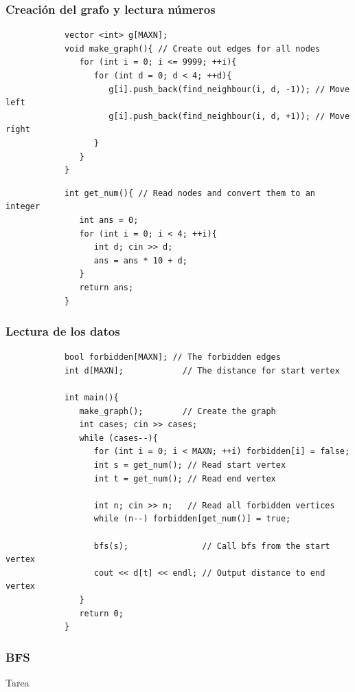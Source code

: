 \documentclass{beamer}
\begin{document}
	\begin{frame}[fragile]
		\frametitle{Creación del grafo y lectura números}
		\begin{lstlisting}
			vector <int> g[MAXN];
			void make_graph(){ // Create out edges for all nodes
			   for (int i = 0; i <= 9999; ++i){
			      for (int d = 0; d < 4; ++d){
			         g[i].push_back(find_neighbour(i, d, -1)); // Move left
			         g[i].push_back(find_neighbour(i, d, +1)); // Move right
			      }
			   }
			}
		\end{lstlisting}
		
		\begin{lstlisting}
			int get_num(){ // Read nodes and convert them to an integer
			   int ans = 0;
			   for (int i = 0; i < 4; ++i){
			      int d; cin >> d;
			      ans = ans * 10 + d;
			   }
			   return ans;
			}
		\end{lstlisting}
	\end{frame}
	
	\begin{frame}[fragile]
		\frametitle{Lectura de los datos}
		\begin{lstlisting}
			bool forbidden[MAXN]; // The forbidden edges
			int d[MAXN];            // The distance for start vertex

			int main(){
			   make_graph();        // Create the graph
			   int cases; cin >> cases;
			   while (cases--){
			      for (int i = 0; i < MAXN; ++i) forbidden[i] = false;
			      int s = get_num(); // Read start vertex
			      int t = get_num(); // Read end vertex

			      int n; cin >> n;   // Read all forbidden vertices
			      while (n--) forbidden[get_num()] = true;
		
			      bfs(s);               // Call bfs from the start vertex
			      cout << d[t] << endl; // Output distance to end vertex
			   }
			   return 0;
			}
		\end{lstlisting}
	\end{frame}
	
	\begin{frame}[fragile]
		\frametitle{BFS}
		\huge{Tarea}
	\end{frame}
\end{document}
